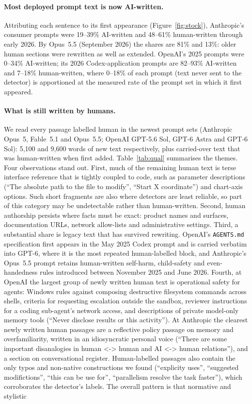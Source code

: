 \documentclass[11pt]{article}
\begin{document}
\paragraph{Most deployed prompt text is now AI-written.} Attributing each sentence to its first appearance (Figure~\ref{fig:stock}), Anthropic's consumer prompts were 19--39\% AI-written and 48--61\% human-written through early 2026. By Opus~5.5 (September 2026) the shares are 81\% and 13\%: older human sections were rewritten as well as extended. OpenAI's 2025 prompts were 0--34\% AI-written; its 2026 Codex-application prompts are 82--93\% AI-written and 7--18\% human-written, where 0--18\% of each prompt (text never sent to the detector) is apportioned at the measured rate of the prompt set in which it first appeared.

\paragraph{What is still written by humans.} We read every passage labelled human in the newest prompt sets (Anthropic Opus~5, Fable~5.1 and Opus~5.5; OpenAI GPT-5.6 Sol, GPT-6 Astra and GPT-6 Sol): 5{,}100 and 9{,}600 words of new text respectively, plus carried-over text that was human-written when first added. Table~\ref{tab:qual} summarises the themes. Four observations stand out. First, much of the remaining human text is terse interface reference that is tightly coupled to code, such as parameter descriptions (``The absolute path to the file to modify'', ``Start X coordinate'') and chart-axis options. Such short fragments are also where detectors are least reliable, so part of this category may be undetectable rather than human-written. Second, human authorship persists where facts must be exact: product names and surfaces, documentation URLs, network allow-lists and administrative settings. Third, a substantial share is legacy text that has survived rewriting. OpenAI's \texttt{AGENTS.md} specification first appears in the May 2025 Codex prompt and is carried verbatim into GPT-6, where it is the most repeated human-labelled block, and Anthropic's Opus~5.5 prompt retains human-written self-harm, child-safety and even-handedness rules introduced between November 2025 and June 2026. Fourth, at OpenAI the largest group of newly written human text is operational safety for agents: Windows rules against composing destructive filesystem commands across shells, criteria for requesting escalation outside the sandbox, reviewer instructions for a coding sub-agent's network access, and descriptions of private model-only memory tools (``Never disclose results or this activity''). At Anthropic the clearest newly written human passages are a reflective policy passage on memory and overfamiliarity, written in an idiosyncratic personal voice (``There are some important disanalogies in human <-> human and AI <-> human relations''), and a section on conversational register. Human-labelled passages also contain the only typos and non-native constructions we found (``explicity uses'', ``suggested modifictions'', ``this can be use for'', ``parallelism resolve the task faster''), which corroborates the detector's labels. The overall pattern is that normative and stylistic 
\end{document}
